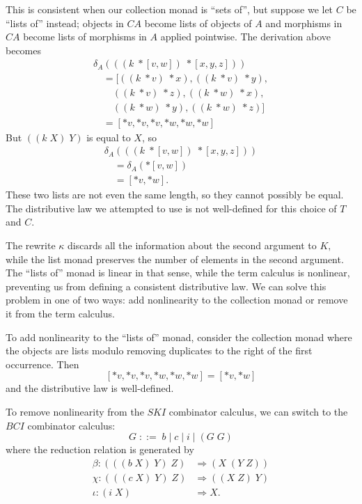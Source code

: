 \documentclass[]{acm_proc_article-sp}
\numberwithin{equation}{subsection}
\begin{document}
This is consistent when our collection monad is ``sets of'', but suppose we let $C$ be ``lists of'' instead; objects in $CA$ become lists of objects of $A$ and morphisms in $CA$ become lists of morphisms in $A$ applied pointwise.  The derivation above becomes
  \[\begin{array}{l}
    \delta_A(((k\; *[ v,w])\; *[ x,y,z ])) \\
    \quad   = [((k\; *v)\; *x), ((k\; *v)\; *y),\\
    \quad\quad  ((k\; *v)\; *z), ((k\; *w)\; *x),\\
    \quad\quad  ((k\; *w)\; *y), ((k\; *w)\; *z)] \\
    \quad   = [*v, *v, *v, *w, *w, *w]
  \end{array}\]
But $((k\; X)\; Y)$ is equal to $X$, so
  \[\begin{array}{l}
    \delta_A(((k\; *[ v,w ])\; *[ x,y,z ])) \\
    \quad   = \delta_A(*[ v,w ])\\
    \quad   = [ *v, *w ].
  \end{array}\]
These two lists are not even the same length, so they cannot possibly be equal.  The distributive law we attempted to use is not well-defined for this choice of $T$ and $C$.  

The rewrite $\kappa$ discards all the information about the second argument to $K,$ while the list monad preserves the number of elements in the second argument.  The ``lists of'' monad is linear in that sense, while the term calculus is nonlinear, preventing us from defining a consistent distributive law.  We can solve this problem in one of two ways: add nonlinearity to the collection monad or remove it from the term calculus.  

To add nonlinearity to the ``lists of'' monad, consider the collection monad where the objects are lists modulo removing duplicates to the right of the first occurrence.  Then
\[ [*v, *v, *v, *w, *w, *w] = [ *v, *w ] \]
and the distributive law is well-defined.

To remove nonlinearity from the $SKI$ combinator calculus, we can switch to the $BCI$ combinator calculus:
\[ G\; ::=\; b\; |\; c\; |\; i\; |\; (G\; G) \]
where the reduction relation is generated by
\[\begin{array}{rl}
  \beta\colon (((b\; X)\; Y)\; Z) & \Rightarrow (X\; (Y\; Z))\\
  \chi\colon (((c\; X)\; Y)\; Z) & \Rightarrow ((X\; Z)\; Y)\\
  \iota\colon (i\; X) & \Rightarrow X.\\
\end{array}\]
\end{document}
